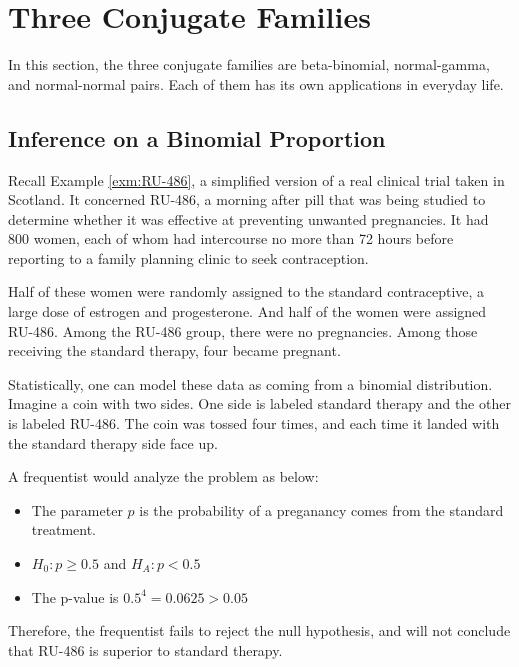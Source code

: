 \documentclass[]{book}
\theoremstyle{definition}
\theoremstyle{definition}
\theoremstyle{definition}
\theoremstyle{remark}
\let\BeginKnitrBlock\begin \let\EndKnitrBlock\end
\begin{document}
\section{Three Conjugate Families}\label{three-conjugate-families}

In this section, the three conjugate families are beta-binomial,
normal-gamma, and normal-normal pairs. Each of them has its own
applications in everyday life.

\subsection{Inference on a Binomial
Proportion}\label{inference-on-a-binomial-proportion}

\BeginKnitrBlock{example}
\protect\hypertarget{exm:RU-486more}{}\label{exm:RU-486more} Recall Example
\ref{exm:RU-486}, a simplified version of a real clinical trial taken in
Scotland. It concerned RU-486, a morning after pill that was being
studied to determine whether it was effective at preventing unwanted
pregnancies. It had 800 women, each of whom had intercourse no more than
72 hours before reporting to a family planning clinic to seek
contraception.

Half of these women were randomly assigned to the standard
contraceptive, a large dose of estrogen and progesterone. And half of
the women were assigned RU-486. Among the RU-486 group, there were no
pregnancies. Among those receiving the standard therapy, four became
pregnant.
\EndKnitrBlock{example}

Statistically, one can model these data as coming from a binomial
distribution. Imagine a coin with two sides. One side is labeled
standard therapy and the other is labeled RU-486. The coin was tossed
four times, and each time it landed with the standard therapy side face
up.

A frequentist would analyze the problem as below:

\begin{itemize}
\item
  The parameter \(p\) is the probability of a preganancy comes from the
  standard treatment.
\item
  \(H_0: p \geq 0.5\) and \(H_A: p < 0.5\)
\item
  The p-value is \(0.5^4 = 0.0625 > 0.05\)
\end{itemize}

Therefore, the frequentist fails to reject the null hypothesis, and will
not conclude that RU-486 is superior to standard therapy.
\end{document}
